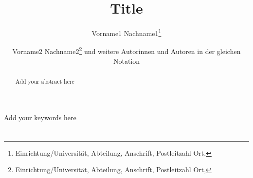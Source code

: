 \documentclass[]{lni}
\begin{document}
\author[Vorname1 Name1\and Vorname2 Name 2]{Vorname1 Nachname1\footnote{Einrichtung/Universität, Abteilung, Anschrift, Postleitzahl Ort, }\and Vorname2 Nachname2\footnote{Einrichtung/Universität, Abteilung, Anschrift, Postleitzahl Ort, } und weitere Autorinnen und Autoren in der gleichen Notation}
\title[Short title (if necessary)]{Title}
\maketitle

\begin{abstract}
Add your abstract here
\end{abstract}
\begin{keywords}
Add your keywords here
\end{keywords}

\section{}


\end{document}
